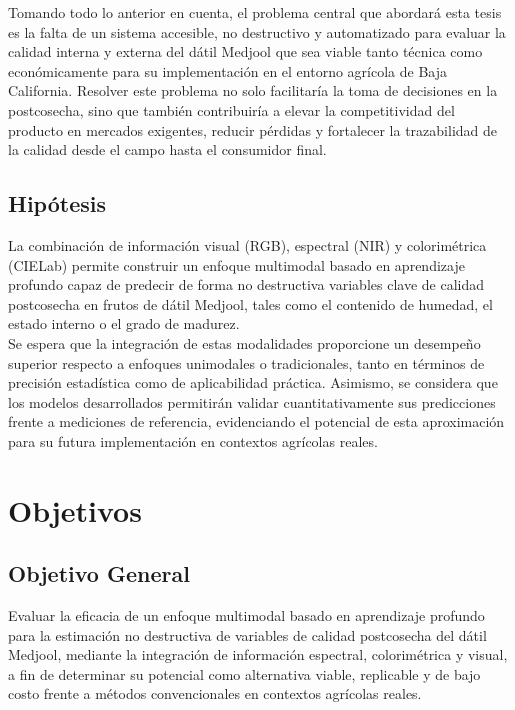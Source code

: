 Tomando todo lo anterior en cuenta, el problema central que abordará esta tesis es la falta de un sistema accesible, no destructivo y automatizado para evaluar la calidad interna y externa del dátil Medjool que sea viable tanto técnica como económicamente para su implementación en el entorno agrícola de Baja California. Resolver este problema no solo facilitaría la toma de decisiones en la postcosecha, sino que también contribuiría a elevar la competitividad del producto en mercados exigentes, reducir pérdidas y fortalecer la trazabilidad de la calidad desde el campo hasta el consumidor final.


\subsection{Hipótesis}

La combinación de información visual (RGB), espectral (NIR) y colorimétrica (CIELab) permite construir un enfoque multimodal basado en aprendizaje profundo capaz de predecir de forma no destructiva variables clave de calidad postcosecha en frutos de dátil Medjool, tales como el contenido de humedad, el estado interno o el grado de madurez.\\

Se espera que la integración de estas modalidades proporcione un desempeño superior respecto a enfoques unimodales o tradicionales, tanto en términos de precisión estadística como de aplicabilidad práctica. Asimismo, se considera que los modelos desarrollados permitirán validar cuantitativamente sus predicciones frente a mediciones de referencia, evidenciando el potencial de esta aproximación para su futura implementación en contextos agrícolas reales.


\section{Objetivos}

\subsection{Objetivo General}

Evaluar la eficacia de un enfoque multimodal basado en aprendizaje profundo para la estimación no destructiva de variables de calidad postcosecha del dátil Medjool, mediante la integración de información espectral, colorimétrica y visual, a fin de determinar su potencial como alternativa viable, replicable y de bajo costo frente a métodos convencionales en contextos agrícolas reales.


